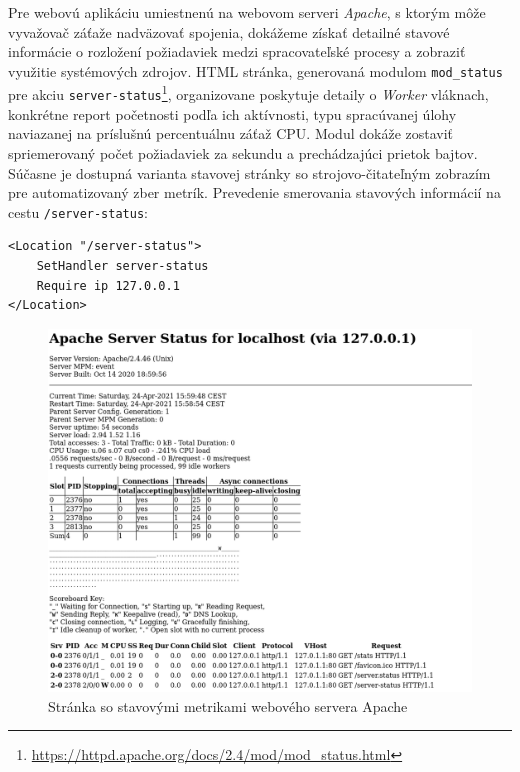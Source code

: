 \documentclass[12pt, a4paper]{article}
\begin{document}
Pre webovú aplikáciu umiestnenú na webovom serveri \emph{Apache}, s ktorým môže vyvažovač záťaže nadväzovať
spojenia, dokážeme získať detailné stavové informácie o rozložení požiadaviek medzi spracovateľské procesy a 
zobraziť využitie systémových zdrojov. HTML stránka, generovaná modulom \verb|mod_status| pre akciu
\verb|server-status|\footnote{\url{https://httpd.apache.org/docs/2.4/mod/mod_status.html}}, organizovane 
poskytuje detaily o \emph{Worker} vláknach, konkrétne report početnosti podľa ich aktívnosti,
typu spracúvanej úlohy naviazanej na príslušnú percentuálnu záťaž CPU. Modul dokáže zostaviť spriemerovaný 
počet požiadaviek za sekundu a prechádzajúci prietok bajtov. Súčasne je dostupná varianta stavovej stránky 
so strojovo-čitateľným zobrazím pre automatizovaný zber metrík. Prevedenie smerovania stavových informácií 
na cestu \verb|/server-status|:
\begin{lstlisting}
<Location "/server-status">
    SetHandler server-status
    Require ip 127.0.0.1
</Location>
\end{lstlisting}
\begin{figure}[h]
  \centering
  \includegraphics[width=.7\textwidth]{images/Apache-Stats.png}
  \caption{Stránka so stavovými metrikami webového servera Apache}
\end{figure}
\end{document}
